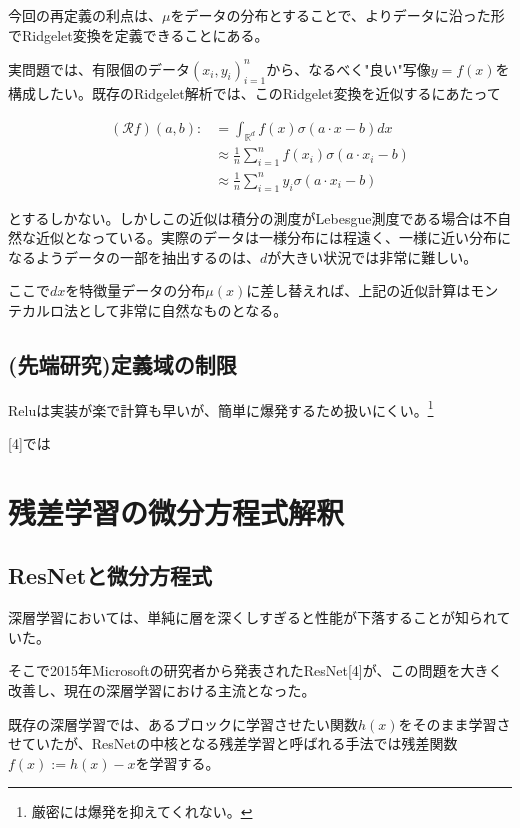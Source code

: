 \documentclass{jsarticle}
\begin{document}
今回の再定義の利点は、$\mu$をデータの分布とすることで、よりデータに沿った形でRidgelet変換を定義できることにある。

実問題では、有限個のデータ$(x_i,y_i)^n_{i=1}$から、なるべく"良い"写像$y=f(x)$を構成したい。既存のRidgelet解析では、このRidgelet変換を近似するにあたって

\begin{align}
(\mathcal{R} f)(a,b):&=\int_{\mathbb{R}^d} f(x)\sigma(a\cdot x-b)dx\\
&\approx \frac{1}{n}\sum^n_{i=1} f(x_i)\sigma(a\cdot x_i-b)\\
&\approx \frac{1}{n}\sum^n_{i=1} y_i\sigma(a\cdot x_i-b)
\end{align}

とするしかない。しかしこの近似は積分の測度がLebesgue測度である場合は不自然な近似となっている。実際のデータは一様分布には程遠く、一様に近い分布になるようデータの一部を抽出するのは、$d$が大きい状況では非常に難しい。

ここで$dx$を特徴量データの分布$\mu(x)$に差し替えれば、上記の近似計算はモンテカルロ法として非常に自然なものとなる。



\subsection{(先端研究)定義域の制限}

Reluは実装が楽で計算も早いが、簡単に爆発するため扱いにくい。\footnote{厳密には爆発を抑えてくれない。}

[4]では



\newpage

\section{残差学習の微分方程式解釈}



\subsection{ResNetと微分方程式}
深層学習においては、単純に層を深くしすぎると性能が下落することが知られていた。

そこで2015年Microsoftの研究者から発表されたResNet[4]が、この問題を大きく改善し、現在の深層学習における主流となった。

既存の深層学習では、あるブロックに学習させたい関数$h(x)$をそのまま学習させていたが、ResNetの中核となる残差学習と呼ばれる手法では残差関数$f(x):=h(x)-x$を学習する。
\end{document}
